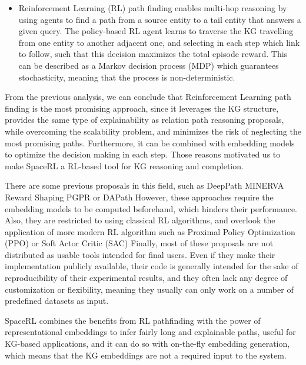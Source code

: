 \begin{itemize}
    \item Reinforcement Learning (RL) 
    path finding enables multi-hop reasoning by using agents to find a path from a source entity to a tail entity that answers a given query.
    The policy-based RL agent learns to traverse the KG travelling from one entity to another adjacent one, and selecting in each step which link to follow, such that this decision maximizes the total episode reward.
    This can be described as a Markov decision process (MDP) which guarantees stochasticity, meaning that the process is non-deterministic. 
\end{itemize}

From the previous analysis, we can conclude that Reinforcement Learning path finding is the most promising approach, since it leverages the KG structure,  provides the same type of explainability as relation path reasoning proposals, while overcoming the scalability problem, and minimizes the risk of neglecting the most promising paths. Furthermore, it can be combined with embedding models to optimize the decision making in each step. Those reasons motivated us to make SpaceRL a RL-based tool for KG reasoning and completion.

There are some previous proposals in this field, such as DeepPath
MINERVA 
Reward Shaping 
PGPR 
or DAPath 
However, these approaches require the embedding models to be computed beforehand, which hinders their performance. Also, they are restricted to using classical RL algorithms, and overlook the application of more modern RL algorithm such as Proximal Policy Optimization (PPO)
or Soft Actor Critic (SAC) 
Finally, most of these proposals are not distributed as usable tools intended for final users. Even if they make their implementation publicly available, their code is generally intended for the sake of reproducibility of their experimental results, and they often lack any degree of customization or flexibility, meaning they usually can only work on a number of predefined datasets as input.

SpaceRL combines the benefits from RL pathfinding with the power of representational embeddings to infer fairly long and explainable paths, useful for KG-based applications, and it can do so with on-the-fly embedding generation, which means that the KG embeddings are not a required input to the system.

